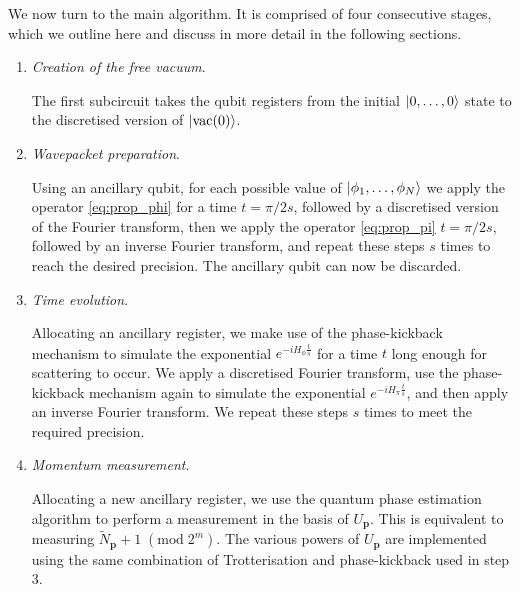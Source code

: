 \documentclass[a4paper,10pt]{report}
\begin{document}
We now turn to the main algorithm. It is comprised of four consecutive stages, which we outline here and discuss in more detail in the following sections.
\begin{enumerate}
\item \textit{Creation of the free vacuum}.

The first subcircuit takes the qubit registers from the initial $\ket{0,\dots,0}$ state to the discretised version of $\ket{\mathrm{vac}(0)}$.
\item \textit{Wavepacket preparation}.

Using an ancillary qubit, for each possible value of $\ket{\phi_1,\dots,\phi_N}$ we apply the operator \eqref{eq:prop_phi} for a time $t=\pi/2s$, followed by a discretised version of the Fourier transform, then we apply the operator \eqref{eq:prop_pi} $t=\pi/2s$, followed by an inverse Fourier transform, and repeat these steps $s$ times to reach the desired precision. The ancillary qubit can now be discarded. 

\item \textit{Time evolution}.

Allocating an ancillary register, we make use of the phase-kickback mechanism to simulate the exponential $e^{-iH_\phi \frac{t}{s}}$ for a time $t$ long enough for scattering to occur. We apply a discretised Fourier transform, use the phase-kickback mechanism again to simulate the exponential $e^{-iH_\pi \frac{t}{s}}$, and then apply an inverse Fourier transform. We repeat these steps $s$ times to meet the required precision.

\item \textit{Momentum measurement}.

Allocating a new ancillary register, we use the quantum phase estimation algorithm to perform a measurement in the basis of $U_\mathbf{p}$. This is equivalent to measuring $\widetilde{N}_\mathbf{p} +1 \;(\mathrm{mod}\;2^m)$. The various powers of $U_\mathbf{p}$ are implemented using the same combination of Trotterisation and phase-kickback used in step 3. 
\end{enumerate} 
\end{document}

